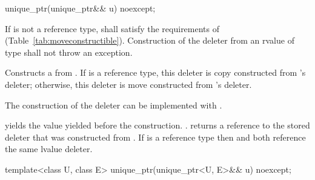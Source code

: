 %
\begin{itemdecl}
unique_ptr(unique_ptr&& u) noexcept;
\end{itemdecl}

\begin{itemdescr}
\pnum
\requires If  is not a reference type,
 shall satisfy the requirements of 
(Table~\ref{tab:moveconstructible}).
Construction
of the deleter from an rvalue of type  shall not
throw an exception.

\pnum
\effects Constructs a  from
. If  is a reference type, this
deleter is copy constructed from 's deleter; otherwise, this
deleter is move constructed from 's deleter. \begin{note} The
construction of the deleter can be implemented with . \end{note}

\pnum
\postconditions {} yields the value 
yielded before the construction. .
 returns a reference
to the stored deleter that was constructed from
. If  is a reference type then
 and  both reference
the same lvalue deleter.
\end{itemdescr}

%
\begin{itemdecl}
template<class U, class E> unique_ptr(unique_ptr<U, E>&& u) noexcept;
\end{itemdecl}

